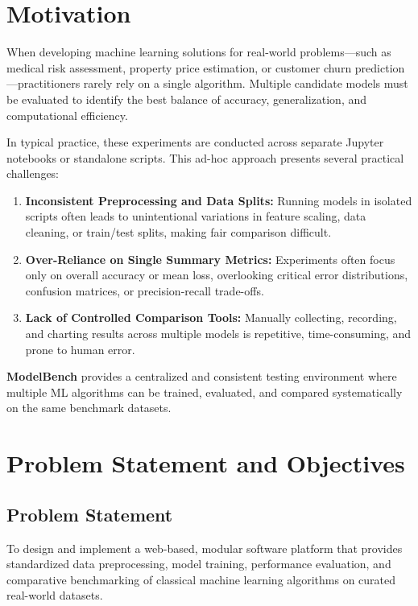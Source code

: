 \documentclass[11pt,a4paper]{article}
\begin{document}
\section{Motivation}
\label{sec:motivation}
When developing machine learning solutions for real-world problems---such as medical risk assessment, property price estimation, or customer churn prediction---practitioners rarely rely on a single algorithm. Multiple candidate models must be evaluated to identify the best balance of accuracy, generalization, and computational efficiency.

In typical practice, these experiments are conducted across separate Jupyter notebooks or standalone scripts. This ad-hoc approach presents several practical challenges:
\begin{enumerate}[leftmargin=*,itemsep=1pt,topsep=2pt]
    \item \textbf{Inconsistent Preprocessing and Data Splits:} Running models in isolated scripts often leads to unintentional variations in feature scaling, data cleaning, or train/test splits, making fair comparison difficult.
    \item \textbf{Over-Reliance on Single Summary Metrics:} Experiments often focus only on overall accuracy or mean loss, overlooking critical error distributions, confusion matrices, or precision-recall trade-offs.
    \item \textbf{Lack of Controlled Comparison Tools:} Manually collecting, recording, and charting results across multiple models is repetitive, time-consuming, and prone to human error.
\end{enumerate}

\textbf{ModelBench} provides a centralized and consistent testing environment where multiple ML algorithms can be trained, evaluated, and compared systematically on the same benchmark datasets.

\section{Problem Statement and Objectives}
\label{sec:problem_statement}

\subsection{Problem Statement}
To design and implement a web-based, modular software platform that provides standardized data preprocessing, model training, performance evaluation, and comparative benchmarking of classical machine learning algorithms on curated real-world datasets.
\end{document}
